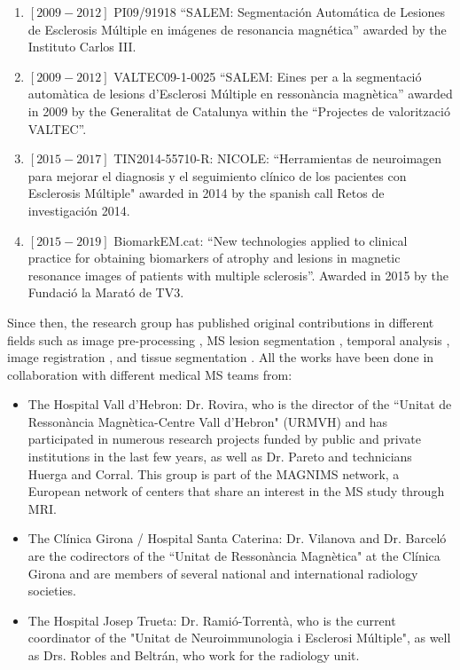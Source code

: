 \begin{enumerate}

\item $[2009-2012]$ PI09/91918 ``SALEM: Segmentaci\'{o}n Autom\'{a}tica de Lesiones de Esclerosis M\'{u}ltiple en im\'{a}genes de resonancia magn\'{e}tica'' awarded by the Instituto Carlos III. 

\item $[2009-2012]$ VALTEC09-1-0025 ``SALEM: Eines per a la segmentaci\'{o} autom\`{a}tica de lesions d'Esclerosi M\'{u}ltiple en resson\`{a}ncia magn\`{e}tica'' awarded in 2009 by the Generalitat de Catalunya within the ``Projectes de valoritzaci\'{o} VALTEC''.

\item $[2015-2017]$ TIN2014-55710-R: NICOLE: ``Herramientas de neuroimagen para mejorar el diagnosis y el seguimiento cl\'{i}nico de los pacientes con Esclerosis M\'{u}ltiple" awarded in 2014 by the spanish call Retos de investigaci\'{o}n 2014.

\item $[2015-2019]$ BiomarkEM.cat: ``New technologies applied to clinical practice for obtaining biomarkers of  atrophy and lesions in magnetic resonance images of patients with multiple sclerosis''. Awarded in 2015 by the Fundaci\'{o} la Marat\'{o} de TV3.

\end{enumerate}

Since then, the research group has published original contributions in different fields such as image pre-processing \cite{Roura2014}, MS lesion segmentation \cite{Cabezas2014, Cabezas2014b, Llado2012, Roura2015}, temporal analysis \cite{Ganiler2014,Llado2012b}, image registration \cite{Diez2014, Roura2015b}, and tissue segmentation \cite{Cabezas2011}. All the works have been done in collaboration with different medical MS teams from:

\begin{itemize}

\item The Hospital Vall d'Hebron: Dr. Rovira, who is the director of the ``Unitat de Resson\`{a}ncia Magn\`{e}tica-Centre Vall d'Hebron" (URMVH) and has participated in numerous research projects funded by public and private institutions in the last few years, as well as Dr. Pareto and technicians Huerga and Corral. This group is part of the MAGNIMS network, a European network of centers that share an interest in the MS study through MRI.
 
	 \item The Cl\'{i}nica Girona / Hospital Santa Caterina: Dr. Vilanova and Dr. Barcel\'{o} are the codirectors of the ``Unitat de Resson\`{a}ncia Magn\`{e}tica" at the Cl\'{i}nica Girona and are members of several national and international radiology societies.
 
	\item The Hospital Josep Trueta: Dr. Rami\'{o}-Torrent\`{a}, who is the current coordinator of the "Unitat de Neuroimmunologia i Esclerosi M\'{u}ltiple", as well as Drs. Robles and Beltr\'{a}n, who work for the radiology unit.

\end{itemize}

